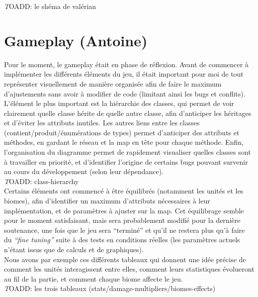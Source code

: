 \documentclass[12pt]{report}
\begin{document}
\textit TOADD: le shéma de valérian\\


\newpage

\section{Gameplay (Antoine)}

Pour le moment, le gameplay était en phase de réflexion. Avant de commencer à implémenter les différents éléments du jeu, il était important pour moi de tout représenter visuellement de manière organisée afin de faire le maximum d’ajustements sans avoir à modifier de code (limitant ainsi les bugs et conflits).\\

L’élément le plus important est la hiérarchie des classes, qui permet de voir clairement quelle classe hérite de quelle autre classe, afin d’anticiper les héritages et d’éviter les attributs inutiles. Les autres liens entre les classes (contient/produit/énumérations de types) permet d’anticiper des attributs et méthodes, en gardant le réseau et la map en tête pour chaque méthode. Enfin, l’organisation du diagramme permet de rapidement visualiser quelles classes sont à travailler en priorité, et d’identifier l’origine de certains bugs pouvant survenir au cours du développement (selon leur dépendance).\\

\textit TOADD: class-hierarchy\\

Certains éléments ont commencé à être équilibrés (notamment les unités et les biomes), afin d’identifier un maximum d’attributs nécessaires à leur implémentation, et de paramètres à ajuster sur la map. Cet équilibrage semble pour le moment satisfaisant, mais sera probablement modifié pour la dernière soutenance, une fois que le jeu sera “terminé” et qu’il ne restera plus qu’à faire du \textit{“fine tuning”} suite à des tests en conditions réelles (les paramètres actuels n’étant issus que de calculs et de graphiques).\\
Nous avons par exemple ces différents tableaux qui donnent une idée précise de comment les unités interagissent entre elles, comment leurs statistiques évolueront au fil de la partie, et comment chaque biome affecte le jeu.\\

\textit TOADD: les trois tableaux (stats/damage-multipliers/biomes-effects)\\
\end{document}
